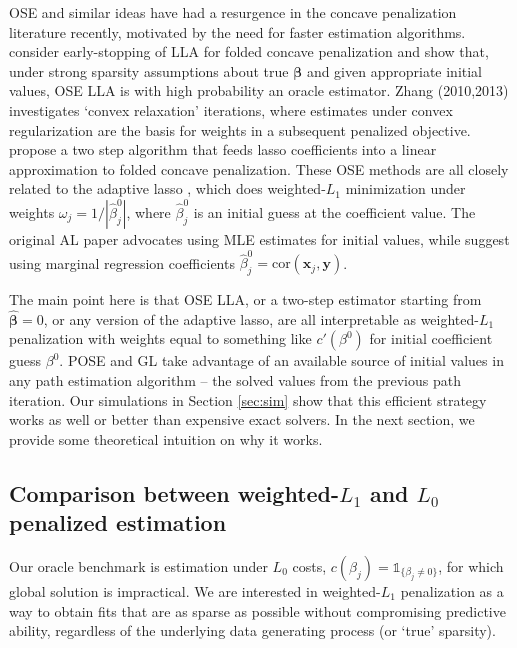 \documentclass[12pt]{article}
\newcommand{\bs}[1]{\boldsymbol{#1}}
\newcommand{\mr}[1]{\mathrm{#1}}
\newcommand{\bm}[1]{\mathbf{#1}}
\newcommand{\ds}[1]{\mathds{#1}}
\begin{document}
OSE and similar ideas have had a resurgence in the concave penalization
literature recently, motivated by the need for faster estimation algorithms.
\cite{fan_strong_2014} consider early-stopping of LLA for folded concave
penalization  and show that, under strong sparsity assumptions about true
$\bs{\beta}$ and given appropriate initial values, OSE LLA is with high
probability an oracle estimator.   Zhang (2010,2013)
\nocite{zhang_analysis_2010,zhang_multi-stage_2013} investigates  
`convex relaxation' iterations, where estimates under convex regularization
 are the basis for weights in a subsequent penalized objective.
 \cite{wang_calibrating_2013} propose a two step algorithm that feeds lasso
 coefficients into a linear approximation to folded concave penalization.
 These OSE methods are all closely related to  the adaptive lasso
\citep[AL;][]{zou_adaptive_2006}, which does weighted-$L_1$ minimization under
weights $\omega_j = 1/|\hat\beta^0_j|$, where $\hat\beta^0_j$ is an initial
guess at the coefficient value.  The original AL paper advocates using MLE
estimates for initial values, while
\cite{huang_adaptive_2008} suggest using marginal regression coefficients
$\hat\beta^0_j = \mr{cor}(\bm{x}_j,\bm{y})$.

The main point here is that OSE LLA, or a two-step estimator starting from
$\bs{\hat\beta}=0$, or any version of the adaptive lasso, are all  interpretable as weighted-$L_1$ 
penalization with weights equal to something like $c'(\beta^0)$ for initial
coefficient guess $\beta^0$. POSE and GL take advantage of an  available
source of initial values in any path estimation algorithm -- the solved values
from the previous path iteration.  Our  simulations in Section \ref{sec:sim}
show that this efficient strategy works as well or better than  expensive
exact solvers.  In the next section, we provide some theoretical intuition on
why it works.


\subsection{Comparison between weighted-$L_1$ and $L_0$ penalized estimation}


Our oracle benchmark is estimation under $L_0$ costs, $c(\beta_j) =
\ds{1}_{\{\beta_j\neq0\}}$, for which global solution is impractical.   We are
interested in weighted-$L_1$ penalization as a way to obtain fits that are as
sparse as possible without compromising predictive ability, regardless of the
underlying data generating process (or `true' sparsity).
\end{document}
